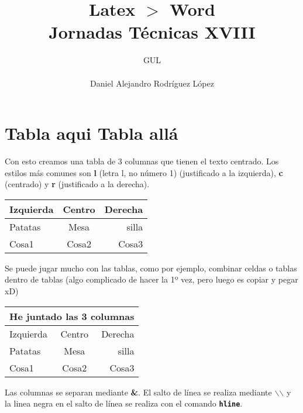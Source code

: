 \documentclass[10pt,a4paper,titlepage]{article} %
\title{ \textbf{ \Huge{Latex $>$ Word}} \\ Jornadas Técnicas XVIII}
\author{
		\begin{tabular}{l}
			\multicolumn{1}{l}{GUL} \\ \hline \\
			Daniel Alejandro Rodríguez López \\
		\end{tabular}
}
\begin{document}
\maketitle
\newpage

\tableofcontents
\newpage

	\section{Tabla aqui Tabla allá}
	Con esto creamos una tabla de 3 columnas que tienen el texto centrado. Los estilos más comunes son \textbf{l} (letra l, no número 1) (justificado a la izquierda), \textbf{c} (centrado) y \textbf{r} (justificado a la derecha). 

	\begin{center}
	\begin{tabular}{l c r}
	Izquierda & Centro & Derecha \\ \hline
	Patatas & Mesa & silla \\
	Cosa1 & Cosa2 & Cosa3 \\ \hline
	\end{tabular}
	\end{center}


	Se puede jugar mucho con las tablas, como por ejemplo, combinar celdas o tablas dentro de tablas (algo complicado de hacer la 1º vez, pero luego es copiar y pegar xD)

	\begin{center}
	\begin{tabular}{l c r}
	\multicolumn{3}{c}{He juntado las 3 columnas} \\ \hline
	Izquierda & Centro & Derecha \\ \hline
	Patatas & Mesa & silla \\
	Cosa1 & Cosa2 & Cosa3 \\ \hline
	\end{tabular}
	\end{center}


	Las columnas se separan mediante \textbf{\&}. El salto de línea se realiza mediante \textbf{$\backslash$$\backslash$} y la linea negra en el salto de línea se realiza con el comando \textbf{\texttt{hline}}.
\end{document}
